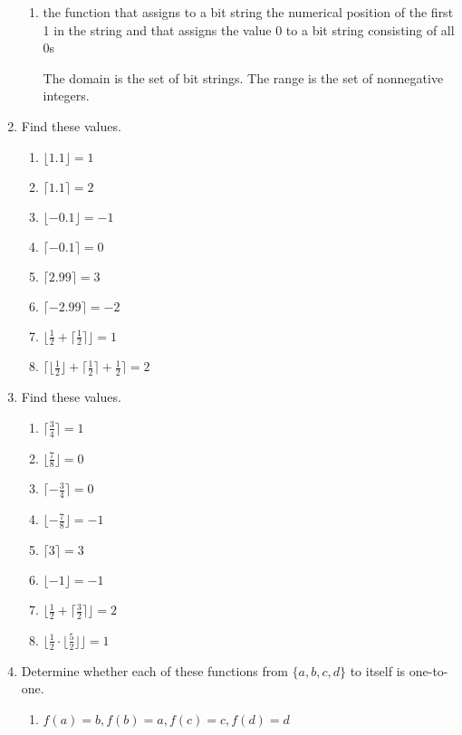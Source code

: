 \documentclass[11pt]{article}
\begin{document}
\begin{enumerate}[label=\textbf{\arabic*.}]
\begin{enumerate}[label=\textbf{\alph*)}]
		\item the function that assigns to a bit string the numerical position of the first 1 in the string and that assigns the value 0 to a bit string consisting of all 0s
		
		The domain is the set of bit strings. The range is the set of nonnegative integers.
	\end{enumerate}

	\item Find these values.
	
	\begin{enumerate}[label=\textbf{\alph*)}]
		\item $\lfloor 1.1 \rfloor = 1$
		\item $\lceil 1.1 \rceil = 2$
		\item $\lfloor -0.1 \rfloor = -1$
		\item $\lceil -0.1 \rceil = 0$
		\item $\lceil 2.99 \rceil = 3$
		\item $\lceil -2.99 \rceil = -2$
		\item $\lfloor \frac{1}{2} + \lceil \frac{1}{2} \rceil \rfloor = 1$
		\item $\lceil \lfloor \frac{1}{2} \rfloor + \lceil \frac{1}{2} \rceil + \frac{1}{2} \rceil = 2$
	\end{enumerate}

	\item Find these values.
	
	\begin{enumerate}[label=\textbf{\alph*)}]
		\item $\lceil \frac{3}{4} \rceil = 1$
		\item $\lfloor \frac{7}{8} \rfloor = 0$
		\item $\lceil -\frac{3}{4} \rceil = 0$
		\item $\lfloor -\frac{7}{8} \rfloor = -1$
		\item $\lceil 3 \rceil = 3$
		\item $\lfloor -1 \rfloor = -1$
		\item $\lfloor \frac{1}{2} + \lceil \frac{3}{2} \rceil \rfloor = 2$
		\item $\lfloor \frac{1}{2} \cdot \lfloor \frac{5}{2} \rfloor \rfloor = 1$
	\end{enumerate}

	\item Determine whether each of these functions from $\{a, b, c, d\}$ to itself is one-to-one.
	\begin{enumerate}[label=\textbf{\alph*)}]
		\item $f(a) = b, f(b) = a, f(c) = c, f(d) = d$
		

\end{enumerate}
\end{enumerate}
\end{document}
